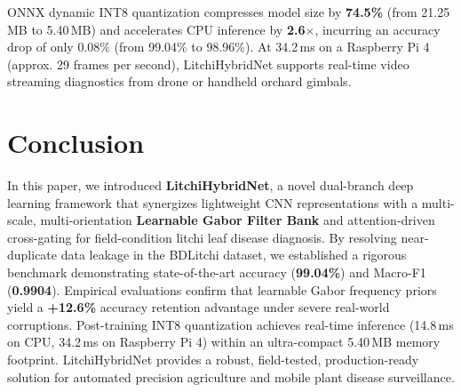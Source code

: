 \documentclass[journal]{IEEEtran}
\begin{document}
ONNX dynamic INT8 quantization compresses model size by \textbf{74.5\%} (from 21.25\,MB to 5.40\,MB) and accelerates CPU inference by \textbf{2.6$\times$}, incurring an accuracy drop of only 0.08\% (from 99.04\% to 98.96\%). At 34.2\,ms on a Raspberry Pi 4 (approx. 29 frames per second), LitchiHybridNet supports real-time video streaming diagnostics from drone or handheld orchard gimbals.

\section{Conclusion}
In this paper, we introduced \textbf{LitchiHybridNet}, a novel dual-branch deep learning framework that synergizes lightweight CNN representations with a multi-scale, multi-orientation \textbf{Learnable Gabor Filter Bank} and attention-driven cross-gating for field-condition litchi leaf disease diagnosis. By resolving near-duplicate data leakage in the BDLitchi dataset, we established a rigorous benchmark demonstrating state-of-the-art accuracy (\textbf{99.04\%}) and Macro-F1 (\textbf{0.9904}). Empirical evaluations confirm that learnable Gabor frequency priors yield a \textbf{+12.6\%} accuracy retention advantage under severe real-world corruptions. Post-training INT8 quantization achieves real-time inference (14.8\,ms on CPU, 34.2\,ms on Raspberry Pi 4) within an ultra-compact 5.40\,MB memory footprint. LitchiHybridNet provides a robust, field-tested, production-ready solution for automated precision agriculture and mobile plant disease surveillance.



\end{document}
